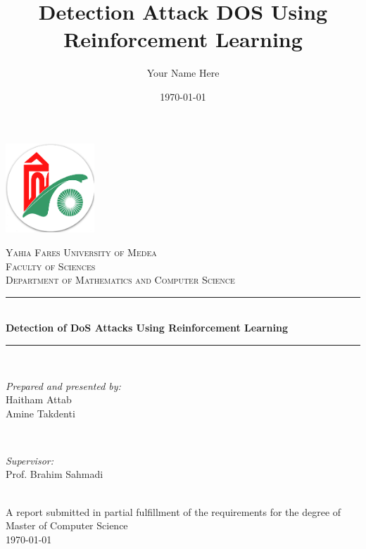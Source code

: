 \documentclass{report}
\title{\Huge{\textbf{Detection Attack DOS Using Reinforcement Learning}}}
\author{Your Name Here}
\date{\today}
\begin{document}
\begin{titlepage}
    \centering
    \includegraphics[width=0.25\textwidth]{./images/univ_logo.png}\par\vspace{1.5cm}
    
    \textsc{\LARGE Yahia Fares University of Medea }\\[0.5cm]
    \textsc{\Large Faculty of Sciences}\\[0.5cm]
    \textsc{\Large Department of Mathematics and Computer Science}\\[2.5cm]

    \rule{\linewidth}{0.5mm} \\[0.4cm]
    { \Huge \bfseries Detection of DoS Attacks Using Reinforcement Learning \\[0.4cm] }
    \rule{\linewidth}{0.5mm} \\[1.5cm]

    \begin{minipage}{0.4\textwidth}
        \begin{flushleft} \large
            \emph{Prepared and presented by:}\\
            Haitham Attab \\
            Amine Takdenti
        \end{flushleft}
    \end{minipage}~
    \begin{minipage}{0.4\textwidth}
        \begin{flushright} \large
            \emph{Supervisor:}\\
            Prof. Brahim Sahmadi
        \end{flushright}
    \end{minipage}\\[2cm]

    {\large A report submitted in partial fulfillment of the requirements for the degree of Master of Computer Science}\\[1cm]
    {\large \today}
    \vfill
\end{titlepage}
\newpage
\end{document}
